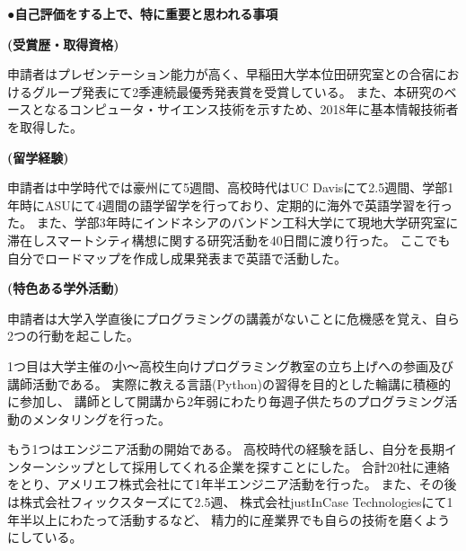 {\noindent
●\textbf{自己評価をする上で、特に重要と思われる事項}

\textbf{(受賞歴・取得資格)}

申請者はプレゼンテーション能力が高く、早稲田大学本位田研究室との合宿におけるグループ発表にて2季連続最優秀発表賞を受賞している。
また、本研究のベースとなるコンピュータ・サイエンス技術を示すため、2018年に基本情報技術者を取得した。

\textbf{(留学経験)}

申請者は中学時代では豪州にて5週間、高校時代はUC Davisにて2.5週間、学部1年時にASUにて4週間の語学留学を行っており、定期的に海外で英語学習を行った。
また、学部3年時にインドネシアのバンドン工科大学にて現地大学研究室に滞在しスマートシティ構想に関する研究活動を40日間に渡り行った。
ここでも自分でロードマップを作成し成果発表まで英語で活動した。

\textbf{(特色ある学外活動)}

申請者は大学入学直後にプログラミングの講義がないことに危機感を覚え、自ら2つの行動を起こした。

1つ目は大学主催の小〜高校生向けプログラミング教室の立ち上げへの参画及び講師活動である。
実際に教える言語(Python)の習得を目的とした輪講に積極的に参加し、
講師として開講から2年弱にわたり毎週子供たちのプログラミング活動のメンタリングを行った。

もう1つはエンジニア活動の開始である。
高校時代の経験を話し、自分を長期インターンシップとして採用してくれる企業を探すことにした。
合計20社に連絡をとり、アメリエフ株式会社にて1年半エンジニア活動を行った。
また、その後は株式会社フィックスターズにて2.5週、
株式会社justInCase Technologiesにて1年半以上にわたって活動するなど、
精力的に産業界でも自らの技術を磨くようにしている。

}

